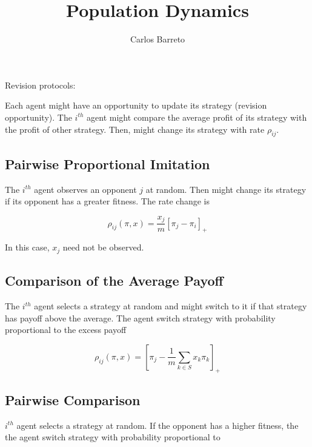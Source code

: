 \documentclass[a4paper,10pt]{article}
\title{Population Dynamics}
\author{Carlos Barreto}
\def\th{^{th}}
\begin{document}
\maketitle







Revision protocols:

Each agent might have an opportunity to update its strategy (revision opportunity). The $i\th$ agent might compare the average profit of its strategy with the profit of other strategy. Then, might change its strategy with rate $\rho_{ij}$.

\subsection{Pairwise Proportional Imitation}

The $i\th$ agent observes an opponent $j$ at random. Then might change its strategy if  its opponent has a greater fitness. The rate change is 

\begin{equation}
\rho_{ij}(\pi, x) = \frac{x_j}{m} [\pi_j - \pi_i]_+
\end{equation}

In this case, $x_j$ need not be observed. 


	

\subsection{Comparison of the Average Payoff}

The $i\th$ agent selects a strategy at random and might switch to it if that strategy has payoff above the average. The agent switch strategy with probability proportional to the excess payoff

\begin{equation}
\rho_{ij}(\pi, x) = \left[ \pi_j - \frac{1}{m} \sum_{k\in S} x_k \pi_k \right]_+
\end{equation}



\subsection{Pairwise Comparison}

$i\th$ agent selects a strategy at random. If the opponent has a higher fitness, the the agent switch strategy with probability proportional to
\end{document}
